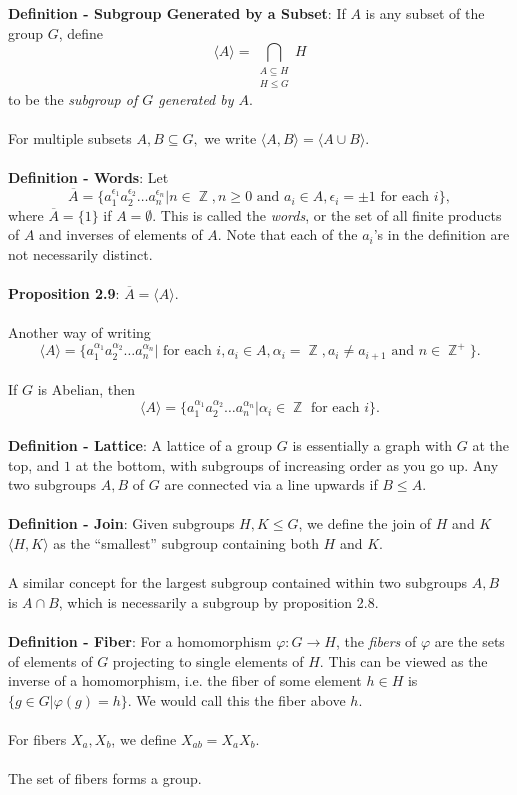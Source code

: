 \documentclass{article}
\DeclareMathOperator{\Z}{\mathbb{Z}}
\begin{document}
\textbf{Definition - Subgroup Generated by a Subset}: If $A$ is any subset of the group $G$, define $$\langle A \rangle = \bigcap_{\substack{A \subseteq H \\ H \leq G}} H$$ to be the \textit{subgroup of $G$ generated by $A$}. \\ \\
For multiple subsets $A, B \subseteq G,$ we write $\langle A, B \rangle = \langle A \cup B \rangle$. \\ \\
\textbf{Definition - Words}: Let $$\overline{A} = \{a_1^{\epsilon_1} a_2^{\epsilon_2} \dots a_n^{\epsilon_n} | n \in \Z, n \geq 0 \text{ and } a_i \in A, \epsilon_i = \pm 1 \text{ for each } i\},$$ where $\overline{A} = \{1\}$ if $A = \emptyset$. This is called the \textit{words}, or the set of all finite products of $A$ and inverses of elements of $A$. Note that each of the $a_i$'s in the definition are not necessarily distinct. \\ \\
\textbf{Proposition 2.9}: $\overline{A} = \langle A \rangle$. \\ \\
Another way of writing $$\langle A \rangle = \{a_1^{\alpha_1} a_2^{\alpha_2} \dots a_n^{\alpha_n} | \text{ for each } i, a_i \in A, \alpha_i = \Z, a_i \neq a_{i + 1} \text{ and } n \in \Z^+\}.$$ \\
If $G$ is Abelian, then $$\langle A \rangle = \{a_1^{\alpha_1} a_2^{\alpha_2} \dots a_n^{\alpha_n} | \alpha_i \in \Z \text{ for each } i\}.$$ \\
\textbf{Definition - Lattice}: A lattice of a group $G$ is essentially a graph with $G$ at the top, and $1$ at the bottom, with subgroups of increasing order as you go up. Any two subgroups $A, B$ of $G$ are connected via a line upwards if $B \leq A$. \\ \\
\textbf{Definition - Join}: Given subgroups $H, K \leq G$, we define the join of $H$ and $K$ $\langle H, K \rangle$ as the ``smallest'' subgroup containing both $H$ and $K$. \\ \\
A similar concept for the largest subgroup contained within two subgroups $A, B$ is $A \cap B$, which is necessarily a subgroup by proposition 2.8. \\ \\
\textbf{Definition - Fiber}: For a homomorphism $\varphi: G \rightarrow H$, the \textit{fibers} of $\varphi$ are the sets of elements of $G$ projecting to single elements of $H$. This can be viewed as the inverse of a homomorphism, i.e. the fiber of some element $h \in H$ is $\{g \in G| \varphi(g) = h\}$. We would call this the fiber above $h$. \\ \\
For fibers $X_a, X_b$, we define $X_{ab} = X_aX_b$. \\ \\
The set of fibers forms a group.
\end{document}
